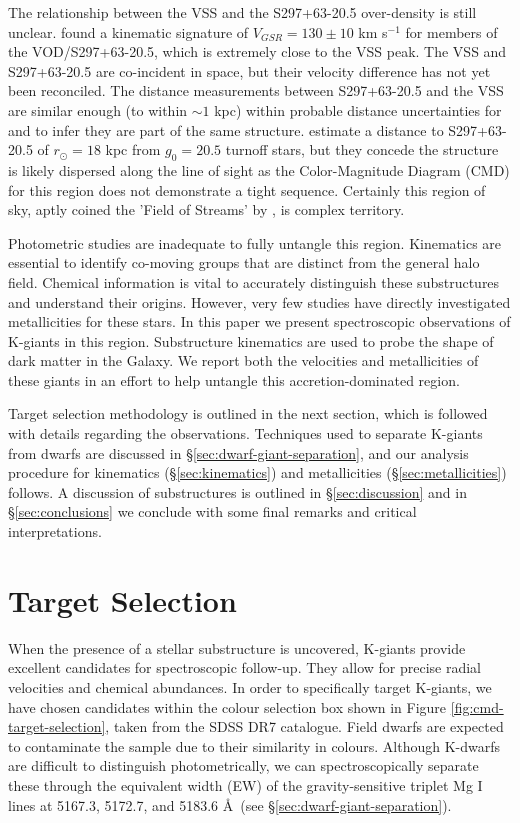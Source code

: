 \documentclass[preprint2]{aastex}
\begin{document}
The relationship between the VSS and the S297+63-20.5 over-density is still unclear. \citet{Newberg;et-al_2007} found a kinematic signature of $V_{GSR} = 130 \pm 10$ km s$^{-1}$ for members of the VOD/S297+63-20.5, which is extremely close to the VSS peak. The VSS and S297+63-20.5 are co-incident in space, but their velocity difference has not yet been reconciled. The distance measurements between S297+63-20.5 and the VSS are similar enough (to within $\sim1$ kpc) within probable distance uncertainties for \citet{Newberg;et-al_2007} and \citet{Prior;et-al_2009a} to infer they are part of the same structure. \citet{Newberg;et-al_2007} estimate a distance to S297+63-20.5 of $r_\odot = 18$ kpc from $g_0 = 20.5$ turnoff stars, but they concede the structure is likely dispersed along the line of sight as the Color-Magnitude Diagram (CMD) for this region does not demonstrate a tight sequence.  Certainly this region of sky, aptly coined the 'Field of Streams' by \citet{Belokurov;et-al_2006}, is complex territory.
	
Photometric studies are inadequate to fully untangle this region. Kinematics are essential to identify co-moving groups that are distinct from the general halo field. Chemical information is vital to accurately distinguish these substructures and understand their origins. However, very few studies have directly investigated metallicities for these stars. In this paper we present spectroscopic observations of K-giants in this region.  Substructure kinematics are used to probe the shape of dark matter in the Galaxy. We report both the velocities and metallicities of these giants in an effort to help untangle this accretion-dominated region.

Target selection methodology is outlined in the next section, which is followed with details regarding the observations. Techniques used to separate K-giants from dwarfs are discussed in \S\ref{sec:dwarf-giant-separation}, and our analysis procedure for kinematics (\S\ref{sec:kinematics}) and metallicities (\S\ref{sec:metallicities}) follows. A discussion of substructures is outlined in \S\ref{sec:discussion} and in \S\ref{sec:conclusions} we conclude with some final remarks and critical interpretations. 
		
\section{Target Selection}
\label{sec:target-selection}
	
When the presence of a stellar substructure is uncovered, K-giants provide excellent candidates for spectroscopic follow-up. They allow for precise radial velocities and chemical abundances. In order to specifically target K-giants, we have chosen candidates within the colour selection box shown in Figure \ref{fig:cmd-target-selection}, taken from the SDSS DR7 catalogue. Field dwarfs are expected to contaminate the sample due to their similarity in colours. Although K-dwarfs are difficult to distinguish photometrically, we can spectroscopically separate these through the equivalent width (EW) of the  gravity-sensitive triplet Mg I lines at 5167.3, 5172.7, and 5183.6 \AA\ (see \S\ref{sec:dwarf-giant-separation}).
\end{document}

